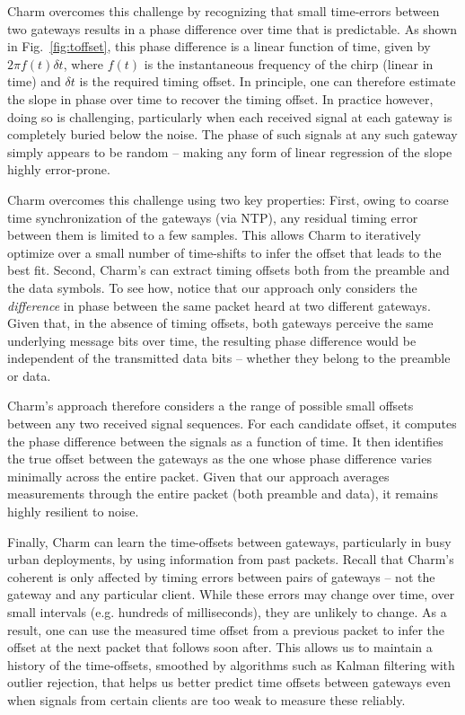  Charm overcomes this
challenge by recognizing that small time-errors between two gateways results
in a phase difference over time that is predictable. As shown in
Fig.~\ref{fig:toffset}, this phase difference is a linear function of time,
given by $2\pi f(t) \delta t$, where $f(t)$ is the instantaneous frequency of
the chirp (linear in time) and $\delta t$ is the required timing offset. In
principle, one can therefore estimate the slope in phase over time to recover
the timing offset. In practice however, doing so is challenging, particularly
when each received signal at each gateway is completely buried below the
noise. The phase of such signals at any such gateway simply appears to be
random -- making any form of linear regression of the slope highly
error-prone.

Charm overcomes this challenge using two key properties: First, owing to
coarse time synchronization of the gateways (via NTP), any residual timing
error between them is limited to a few samples. This allows Charm to
iteratively optimize over a small number of time-shifts to infer the offset
that leads to the best fit. Second, Charm's can extract timing offsets both
from the preamble and the data symbols. To see how, notice that our approach
only considers the {\it difference} in phase between the same packet heard at
two different gateways. Given that, in the absence of timing offsets, both
gateways perceive the same underlying message bits over time, the resulting
phase difference would be independent of the transmitted data bits -- whether
they belong to the preamble or data.

Charm's approach therefore considers a the range of possible small offsets
between any two received signal sequences. For each candidate offset, it
computes the phase difference between the signals as a function of time. It
then identifies the true offset between the gateways as the one whose phase
difference varies minimally across the entire packet. Given that our approach
averages measurements through the entire packet (both preamble and data), it
remains highly resilient to noise.\vspace*{0.1in}


 Finally, Charm
can learn the time-offsets between gateways, particularly in busy urban
deployments, by using information from past packets. Recall that Charm's
coherent is only affected by timing errors between pairs of gateways -- not
the gateway and any particular client. While these errors may change over
time, over small intervals (e.g. hundreds of milliseconds), they are unlikely
to change. As a result, one can use the measured time offset from a previous
packet to infer the offset at the next packet that follows soon after. This
allows us to maintain a history of the time-offsets, smoothed by algorithms
such as Kalman filtering with outlier rejection, that helps us better predict
time offsets between gateways even when signals from certain clients are too
weak to measure these reliably.

